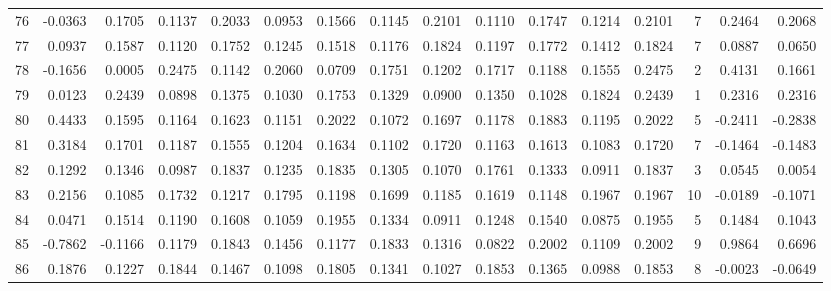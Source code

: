 \begin{tabular}{lrrrrrrrrrrrrrrr}
76  &     -0.0363 &  0.1705 &  0.1137 &  0.2033 &  0.0953 &  0.1566 &  0.1145 &  0.2101 &  0.1110 &  0.1747 &   0.1214 &     0.2101 &      7 &                    0.2464 &                     0.2068 \\
77  &      0.0937 &  0.1587 &  0.1120 &  0.1752 &  0.1245 &  0.1518 &  0.1176 &  0.1824 &  0.1197 &  0.1772 &   0.1412 &     0.1824 &      7 &                    0.0887 &                     0.0650 \\
78  &     -0.1656 &  0.0005 &  0.2475 &  0.1142 &  0.2060 &  0.0709 &  0.1751 &  0.1202 &  0.1717 &  0.1188 &   0.1555 &     0.2475 &      2 &                    0.4131 &                     0.1661 \\
79  &      0.0123 &  0.2439 &  0.0898 &  0.1375 &  0.1030 &  0.1753 &  0.1329 &  0.0900 &  0.1350 &  0.1028 &   0.1824 &     0.2439 &      1 &                    0.2316 &                     0.2316 \\
80  &      0.4433 &  0.1595 &  0.1164 &  0.1623 &  0.1151 &  0.2022 &  0.1072 &  0.1697 &  0.1178 &  0.1883 &   0.1195 &     0.2022 &      5 &                   -0.2411 &                    -0.2838 \\
81  &      0.3184 &  0.1701 &  0.1187 &  0.1555 &  0.1204 &  0.1634 &  0.1102 &  0.1720 &  0.1163 &  0.1613 &   0.1083 &     0.1720 &      7 &                   -0.1464 &                    -0.1483 \\
82  &      0.1292 &  0.1346 &  0.0987 &  0.1837 &  0.1235 &  0.1835 &  0.1305 &  0.1070 &  0.1761 &  0.1333 &   0.0911 &     0.1837 &      3 &                    0.0545 &                     0.0054 \\
83  &      0.2156 &  0.1085 &  0.1732 &  0.1217 &  0.1795 &  0.1198 &  0.1699 &  0.1185 &  0.1619 &  0.1148 &   0.1967 &     0.1967 &     10 &                   -0.0189 &                    -0.1071 \\
84  &      0.0471 &  0.1514 &  0.1190 &  0.1608 &  0.1059 &  0.1955 &  0.1334 &  0.0911 &  0.1248 &  0.1540 &   0.0875 &     0.1955 &      5 &                    0.1484 &                     0.1043 \\
85  &     -0.7862 & -0.1166 &  0.1179 &  0.1843 &  0.1456 &  0.1177 &  0.1833 &  0.1316 &  0.0822 &  0.2002 &   0.1109 &     0.2002 &      9 &                    0.9864 &                     0.6696 \\
86  &      0.1876 &  0.1227 &  0.1844 &  0.1467 &  0.1098 &  0.1805 &  0.1341 &  0.1027 &  0.1853 &  0.1365 &   0.0988 &     0.1853 &      8 &                   -0.0023 &                    -0.0649 \\

\end{tabular}
